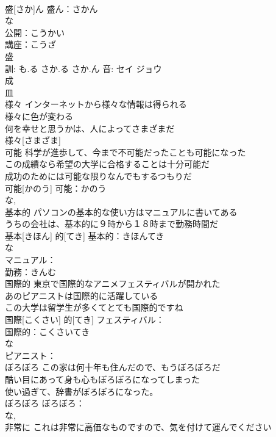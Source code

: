 \documentclass[8pt]{extreport}
\begin{document}
\begin{CJK}{UTF8}{min}
\\	盛[さか]ん			盛ん：さかん
\\	な 
\\	公開：こうかい
\\	講座：こうざ
\\	盛 
\\	訓: も.る さか.る さか.ん 音: セイ ジョウ 
\\	成 
\\	皿 
\\	様々	インターネットから様々な情報は得られる 
\\	様々に色が変わる 
\\	何を幸せと思うかは、人によってさまざまだ 
\\	様々[さまざま]						
\\	可能	科学が進歩して、今まで不可能だったことも可能になった 
\\	この成績なら希望の大学に合格することは十分可能だ 
\\	成功のためには可能な限りなんでもするつもりだ 
\\	可能[かのう]			可能：かのう
\\	な, 
\\	基本的	パソコンの基本的な使い方はマニュアルに書いてある 
\\	うちの会社は、基本的に９時から１８時まで勤務時間だ 
\\	基本[きほん] 的[てき]			基本的：きほんてき
\\	な 
\\	マニュアル：
\\	勤務：きんむ
\\	国際的	東京で国際的なアニメフェスティバルが開かれた 
\\	あのピアニストは国際的に活躍している 
\\	この大学は留学生が多くてとても国際的ですね 
\\	国際[こくさい] 的[てき]			フェスティバル：
\\	国際的：こくさいてき
\\	な 
\\	ピアニスト：
\\	ぼろぼろ	この家は何十年も住んだので、もうぼろぼろだ 
\\	酷い目にあって身も心もぼろぼろになってしまった 
\\	使い過ぎて、辞書がぼろぼろになった。 
\\	ぼろぼろ			ぼろぼろ：
\\	な, 
\\	非常に	これは非常に高価なものですので、気を付けて運んでください 

\end{CJK}
\end{document}
